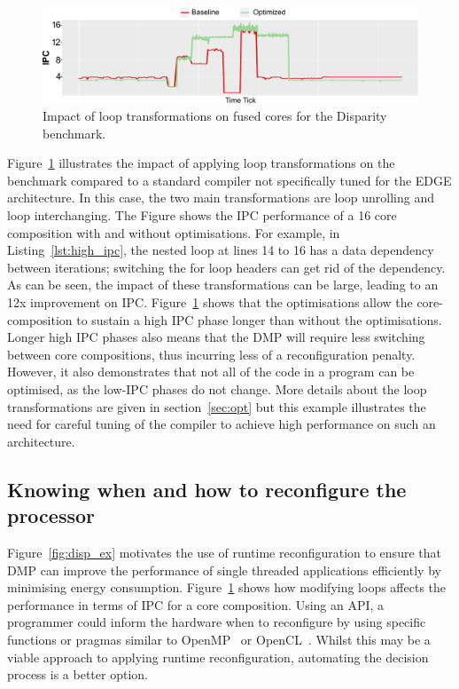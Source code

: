 \begin{figure}[t]
    \includegraphics[width=\textwidth]{cases-paper/graphics/motivation/code_opt_3.pdf}
    \caption{Impact of loop transformations on fused cores for the Disparity benchmark.} 
    \label{fig:compmotiv}
\vspace{1em}
\end{figure}

Figure~\ref{fig:compmotiv} illustrates the impact of applying loop transformations on the  benchmark compared to a standard compiler not specifically tuned for the EDGE architecture.
In this case, the two main transformations are loop unrolling and loop interchanging.
The Figure shows the IPC performance of a 16 core composition with and without optimisations.
For example, in Listing~\ref{lst:high_ipc}, the nested loop at lines 14 to 16 has a data dependency between iterations; switching the for loop headers can get rid of the dependency.
As can be seen, the impact of these transformations can be large, leading to an 12x improvement on IPC.
Figure~\ref{fig:compmotiv} shows that the optimisations allow the core-composition to sustain a high IPC phase longer than without the optimisations.
Longer high IPC phases also means that the DMP will require less switching between core compositions, thus incurring less of a reconfiguration penalty.
However, it also demonstrates that not all of the code in a program can be optimised, as the low-IPC phases do not change.
More details about the loop transformations are given in section~\ref{sec:opt} but this example illustrates the need for careful tuning of the compiler to achieve high performance on such an architecture.

\subsection{Knowing when and how to reconfigure the processor}

Figure~\ref{fig:disp_ex} motivates the use of runtime reconfiguration to ensure that DMP can improve the performance of single threaded applications efficiently by minimising energy consumption.
Figure~\ref{fig:compmotiv} shows how modifying loops affects the performance in terms of IPC for a core composition.
Using an API, a programmer could inform the hardware when to reconfigure by using specific functions or pragmas similar to OpenMP~\cite{openmp} or OpenCL~\cite{opencl}.
Whilst this may be a viable approach to applying runtime reconfiguration, automating the decision process is a better option.

